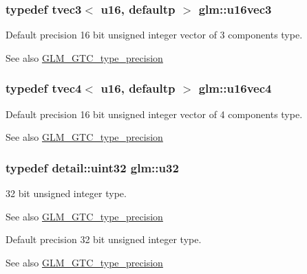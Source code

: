 \subsubsection[{u16vec3}]{\setlength{\rightskip}{0pt plus 5cm}typedef tvec3$<$ u16, defaultp $>$ {\bf glm\+::u16vec3}}\label{group__gtc__type__precision_ga947d0d003e016eaf2038d6843b427257}
Default precision 16 bit unsigned integer vector of 3 components type. \begin{DoxySeeAlso}{See also}
\hyperlink{group__gtc__type__precision}{G\+L\+M\+\_\+\+G\+T\+C\+\_\+type\+\_\+precision} 
\end{DoxySeeAlso}
\hypertarget{group__gtc__type__precision_ga87d1f39c523b4d6d4de0c2778afe5474}{}
\subsubsection[{u16vec4}]{\setlength{\rightskip}{0pt plus 5cm}typedef tvec4$<$ u16, defaultp $>$ {\bf glm\+::u16vec4}}\label{group__gtc__type__precision_ga87d1f39c523b4d6d4de0c2778afe5474}
Default precision 16 bit unsigned integer vector of 4 components type. \begin{DoxySeeAlso}{See also}
\hyperlink{group__gtc__type__precision}{G\+L\+M\+\_\+\+G\+T\+C\+\_\+type\+\_\+precision} 
\end{DoxySeeAlso}
\hypertarget{group__gtc__type__precision_ga54e837745059fd29017bed71cfa0a8db}{}
\subsubsection[{u32}]{\setlength{\rightskip}{0pt plus 5cm}typedef {\bf detail\+::uint32} {\bf glm\+::u32}}\label{group__gtc__type__precision_ga54e837745059fd29017bed71cfa0a8db}
32 bit unsigned integer type. \begin{DoxySeeAlso}{See also}
\hyperlink{group__gtc__type__precision}{G\+L\+M\+\_\+\+G\+T\+C\+\_\+type\+\_\+precision}
\end{DoxySeeAlso}
Default precision 32 bit unsigned integer type. \begin{DoxySeeAlso}{See also}
\hyperlink{group__gtc__type__precision}{G\+L\+M\+\_\+\+G\+T\+C\+\_\+type\+\_\+precision} 
\end{DoxySeeAlso}
\hypertarget{group__gtc__type__precision_ga09dd72852808c32ba398674736b9672a}{}
